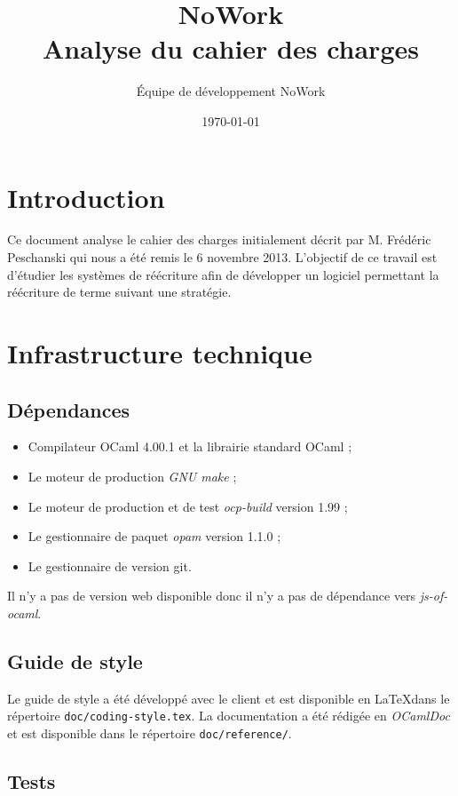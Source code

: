\documentclass[12pt,a4paper]{article}
\title{NoWork\\
Analyse du cahier des charges}
\author{Équipe de développement NoWork\\[2em]}
\date\today
\newcommand{\latex}{\LaTeX\space}
\begin{document}
\maketitle

\section{Introduction}

Ce document analyse le cahier des charges initialement décrit par M. Frédéric Peschanski qui nous a été remis le 6 novembre 2013. L'objectif de ce travail est d'étudier les systèmes de réécriture afin de développer un logiciel permettant la réécriture de terme suivant une stratégie.

\section{Infrastructure technique}

\subsection{Dépendances}

\begin{itemize}
\item Compilateur OCaml 4.00.1 et la librairie standard OCaml ;
\item Le moteur de production \textit{GNU make} ;
\item Le moteur de production et de test \textit{ocp-build} version 1.99 ;
\item Le gestionnaire de paquet \textit{opam} version 1.1.0 ;
\item Le gestionnaire de version git.
\end{itemize}
\vspace{10pt}

Il n'y a pas de version web disponible donc il n'y a pas de dépendance vers \textit{js-of-ocaml}.

\subsection{Guide de style}

Le guide de style a été développé avec le client et est disponible en \latex dans le répertoire \verb=doc/coding-style.tex=. La documentation a été rédigée en \textit{OCamlDoc} et est disponible dans le répertoire \verb=doc/reference/=.

\subsection{Tests}
\end{document}
